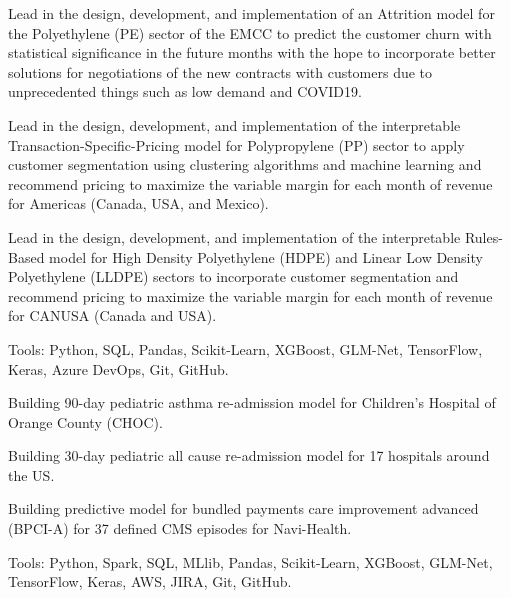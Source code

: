 \documentclass[]{template}
\begin{document}
\begin{tightemize}
\item Lead in the design, development, and implementation of an Attrition model for the Polyethylene (PE) sector of the EMCC to predict the customer churn with statistical significance in the future months with the hope to incorporate better solutions for negotiations of the new contracts with customers due to unprecedented things such as low demand and COVID19.

\item  Lead in the design, development, and implementation of the interpretable Transaction-Specific-Pricing model for Polypropylene (PP) sector to apply customer segmentation using clustering algorithms and machine learning and recommend pricing to maximize the variable margin for each month of revenue for Americas (Canada, USA, and Mexico).

\item Lead in the design, development, and implementation of the interpretable Rules-Based model for High Density Polyethylene (HDPE) and Linear Low Density Polyethylene (LLDPE) sectors to incorporate customer segmentation and recommend pricing to maximize the variable margin for each month of revenue for CANUSA (Canada and USA).

\item Tools: Python, SQL, Pandas, Scikit-Learn, XGBoost, GLM-Net, TensorFlow, Keras, Azure DevOps, Git, GitHub.
\end{tightemize}


\sectionsep
{}

\vspace{\topsep} %
\begin{tightemize}
\item Building 90-day pediatric asthma re-admission model for Children's Hospital of Orange County (CHOC).
\item Building 30-day pediatric all cause re-admission model for 17 hospitals around the US.
\item Building predictive model for bundled payments care improvement advanced (BPCI-A) for 37 defined CMS episodes for Navi-Health.
\item Tools: Python, Spark, SQL, MLlib, Pandas, Scikit-Learn, XGBoost, GLM-Net, TensorFlow, Keras, AWS, JIRA, Git, GitHub.
\end{tightemize}
\sectionsep
\end{document}
